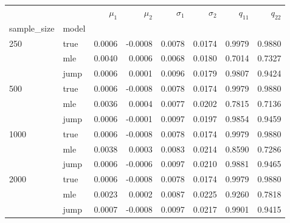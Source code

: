 \begin{tabular}{llrrrrrr}
\toprule
     &      &  $\mu_1$ &  $\mu_2$ &  $\sigma_1$ &  $\sigma_2$ &  $q_11$ &  $q_22$ \\
sample_size & model &          &          &             &             &         &         \\
\midrule
250  & true &   0.0006 &  -0.0008 &      0.0078 &      0.0174 &  0.9979 &  0.9880 \\
     & mle &   0.0040 &   0.0006 &      0.0068 &      0.0180 &  0.7014 &  0.7327 \\
     & jump &   0.0006 &   0.0001 &      0.0096 &      0.0179 &  0.9807 &  0.9424 \\
500  & true &   0.0006 &  -0.0008 &      0.0078 &      0.0174 &  0.9979 &  0.9880 \\
     & mle &   0.0036 &   0.0004 &      0.0077 &      0.0202 &  0.7815 &  0.7136 \\
     & jump &   0.0006 &  -0.0001 &      0.0097 &      0.0197 &  0.9854 &  0.9459 \\
1000 & true &   0.0006 &  -0.0008 &      0.0078 &      0.0174 &  0.9979 &  0.9880 \\
     & mle &   0.0038 &   0.0003 &      0.0083 &      0.0214 &  0.8590 &  0.7286 \\
     & jump &   0.0006 &  -0.0006 &      0.0097 &      0.0210 &  0.9881 &  0.9465 \\
2000 & true &   0.0006 &  -0.0008 &      0.0078 &      0.0174 &  0.9979 &  0.9880 \\
     & mle &   0.0023 &   0.0002 &      0.0087 &      0.0225 &  0.9260 &  0.7818 \\
     & jump &   0.0007 &  -0.0008 &      0.0097 &      0.0217 &  0.9901 &  0.9415 \\
\bottomrule
\end{tabular}
